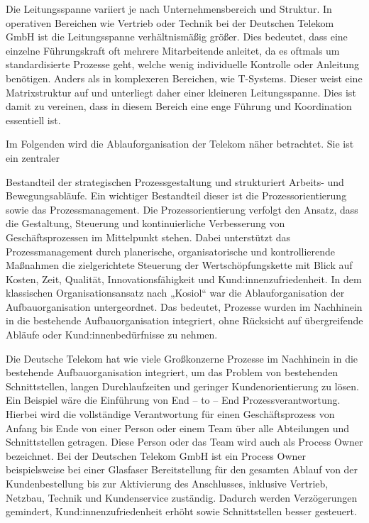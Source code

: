 \documentclass[12pt,a4paper]{article}
\newcommand{\zitat}[1]{\parencite{#1}}
\begin{document}
	\noindent Die Leitungsspanne variiert je nach Unternehmensbereich und Struktur. In
	operativen Bereichen wie Vertrieb oder Technik bei der Deutschen Telekom
	GmbH ist die Leitungsspanne verhältnismäßig größer. Dies bedeutet, dass
	eine einzelne Führungskraft oft mehrere Mitarbeitende anleitet, da es
	oftmals um standardisierte Prozesse geht, welche wenig individuelle
	Kontrolle oder Anleitung benötigen. Anders als in komplexeren Bereichen,
	wie T-Systems. Dieser weist eine Matrixstruktur auf und unterliegt daher
	einer kleineren Leitungsspanne. Dies ist damit zu vereinen, dass in
	diesem Bereich eine enge Führung und Koordination essentiell ist.
	
	\noindent Im Folgenden wird die Ablauforganisation der Telekom näher betrachtet.
	Sie ist ein zentraler
	
	\noindent Bestandteil der strategischen Prozessgestaltung und strukturiert
	Arbeits- und Bewegungsabläufe. Ein wichtiger Bestandteil dieser ist die
	Prozessorientierung sowie das Prozessmanagement. Die Prozessorientierung
	verfolgt den Ansatz, dass die Gestaltung, Steuerung und kontinuierliche
	Verbesserung von Geschäftsprozessen im Mittelpunkt stehen. Dabei
	unterstützt das Prozessmanagement durch planerische, organisatorische
	und kontrollierende Maßnahmen die zielgerichtete Steuerung der
	Wertschöpfungskette mit Blick auf Kosten, Zeit, Qualität,
	Innovationsfähigkeit und Kund:innenzufriedenheit. In dem klassischen
	Organisationsansatz nach „Kosiol`` war die Ablauforganisation der
	Aufbauorganisation untergeordnet. Das bedeutet, Prozesse wurden im
	Nachhinein in die bestehende Aufbauorganisation integriert, ohne
	Rücksicht auf übergreifende Abläufe oder Kund:innenbedürfnisse zu
	nehmen.
	
	\noindent Die Deutsche Telekom hat wie viele Großkonzerne Prozesse im Nachhinein
	in die bestehende Aufbauorganisation integriert, um das Problem von
	bestehenden Schnittstellen, langen Durchlaufzeiten und geringer
	Kundenorientierung zu lösen. Ein Beispiel wäre die Einführung von End --
	to -- End Prozessverantwortung. Hierbei wird die vollständige
	Verantwortung für einen Geschäftsprozess von Anfang bis Ende von einer
	Person oder einem Team über alle Abteilungen und Schnittstellen
	getragen. Diese Person oder das Team wird auch als Process Owner
	bezeichnet. \zitat{schewe2018} Bei der Deutschen Telekom GmbH ist ein
	Process Owner beispielsweise bei einer Glasfaser Bereitstellung für den
	gesamten Ablauf von der Kundenbestellung bis zur Aktivierung des
	Anschlusses, inklusive Vertrieb, Netzbau, Technik und Kundenservice
	zuständig. Dadurch werden Verzögerungen gemindert,
	Kund:innenzufriedenheit erhöht sowie Schnittstellen besser gesteuert.
	
\end{document}
